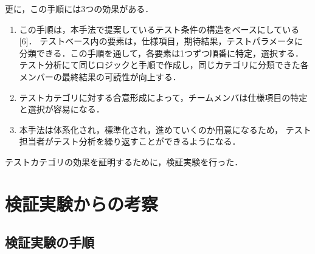 \documentclass[a4paper,11pt]{jreport}
\begin{document}
更に，この手順には3つの効果がある．
\begin{enumerate}
\item この手順は，本手法で提案しているテスト条件の構造をベースにしている [6]． テストベース内の要素は，仕様項目，期待結果，テストパラメータに分類できる．この手順を通して，各要素は1つずつ順番に特定，選択する． テスト分析にて同じロジックと手順で作成し，同じカテゴリに分類できた各メンバーの最終結果の可読性が向上する．
\item テストカテゴリに対する合意形成によって，チームメンバは仕様項目の特定と選択が容易になる．
\item 本手法は体系化され，標準化され，進めていくのか用意になるため， テスト担当者がテスト分析を繰り返すことができるようになる．
\end{enumerate}

テストカテゴリの効果を証明するために，検証実験を行った．

\section{検証実験からの考察}
\subsection{検証実験の手順}
\end{document}

